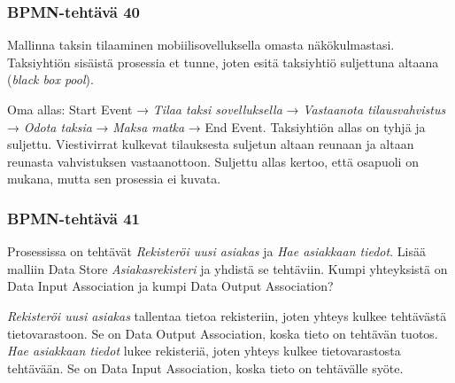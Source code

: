 \documentclass[
  finnish,
  letterpaper,
  DIV=11,
  numbers=noendperiod,
  oneside]{scrreprt}
\begin{document}
\subsubsection{BPMN-tehtävä 40}\label{bpmn-tehtuxe4vuxe4-40}

Mallinna taksin tilaaminen mobiilisovelluksella omasta näkökulmastasi.
Taksiyhtiön sisäistä prosessia et tunne, joten esitä taksiyhtiö
suljettuna altaana (\emph{black box pool}).

\begin{tcolorbox}[enhanced jigsaw, arc=.35mm, bottomrule=.15mm, bottomtitle=1mm, breakable, colback=white, colbacktitle=quarto-callout-tip-color!10!white, colframe=quarto-callout-tip-color-frame, coltitle=black, left=2mm, leftrule=.75mm, opacityback=0, opacitybacktitle=0.6, rightrule=.15mm, title=\textcolor{quarto-callout-tip-color}{\faLightbulb}\hspace{0.5em}{Malliratkaisu}, titlerule=0mm, toprule=.15mm, toptitle=1mm]

Oma allas: Start Event → \emph{Tilaa taksi sovelluksella} →
\emph{Vastaanota tilausvahvistus} → \emph{Odota taksia} → \emph{Maksa
matka} → End Event. Taksiyhtiön allas on tyhjä ja suljettu. Viestivirrat
kulkevat tilauksesta suljetun altaan reunaan ja altaan reunasta
vahvistuksen vastaanottoon. Suljettu allas kertoo, että osapuoli on
mukana, mutta sen prosessia ei kuvata.

\end{tcolorbox}

\subsubsection{BPMN-tehtävä 41}\label{bpmn-tehtuxe4vuxe4-41}

Prosessissa on tehtävät \emph{Rekisteröi uusi asiakas} ja \emph{Hae
asiakkaan tiedot}. Lisää malliin Data Store \emph{Asiakasrekisteri} ja
yhdistä se tehtäviin. Kumpi yhteyksistä on Data Input Association ja
kumpi Data Output Association?

\begin{tcolorbox}[enhanced jigsaw, arc=.35mm, bottomrule=.15mm, bottomtitle=1mm, breakable, colback=white, colbacktitle=quarto-callout-tip-color!10!white, colframe=quarto-callout-tip-color-frame, coltitle=black, left=2mm, leftrule=.75mm, opacityback=0, opacitybacktitle=0.6, rightrule=.15mm, title=\textcolor{quarto-callout-tip-color}{\faLightbulb}\hspace{0.5em}{Malliratkaisu}, titlerule=0mm, toprule=.15mm, toptitle=1mm]

\emph{Rekisteröi uusi asiakas} tallentaa tietoa rekisteriin, joten
yhteys kulkee tehtävästä tietovarastoon. Se on Data Output Association,
koska tieto on tehtävän tuotos. \emph{Hae asiakkaan tiedot} lukee
rekisteriä, joten yhteys kulkee tietovarastosta tehtävään. Se on Data
Input Association, koska tieto on tehtävälle syöte.

\end{tcolorbox}
\end{document}
